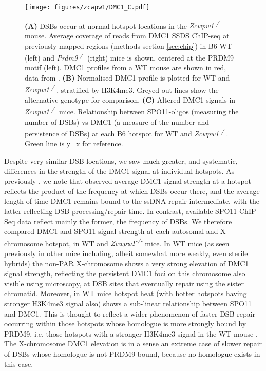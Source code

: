 \begin{figure}[H]
	\centering
	\texttt{[image: figures/zcwpw1/DMC1\_C.pdf]}
	\caption[DMC1 SSDS ChIPseq]{
		\textbf{(A)} DSBs occur at normal hotspot locations in the \textit{Zcwpw1\textsuperscript{-/-}} mouse.
			Average coverage of reads from DMC1 SSDS ChIP-seq at previously mapped regions (methods section \ref{sec:chip}) in B6 WT (left) and \textit{Prdm9\textsuperscript{-/-}} (right) mice is shown, centered at the PRDM9 motif (left).
			DMC1 profiles from a WT mouse are shown in red, data from \parencite{Brick2012Genetic}.
		\textbf{(B)} Normalised DMC1 profile is plotted for WT and \textit{Zcwpw1\textsuperscript{-/-}}, stratified by H3K4me3.
			Greyed out lines show the alternative genotype for comparison.
		\textbf{(C)} Altered DMC1 signals in \textit{Zcwpw1\textsuperscript{-/-}} mice.
			Relationship between SPO11-oligos (measuring the number of DSBs) vs DMC1 (a measure of the number and persistence of DSBs) at each B6 hotspot for WT and \textit{Zcwpw1\textsuperscript{-/-}}.
			Green line is y=x for reference.
	}
	\label{fig:DMC1_SSDS}
\end{figure} 

Despite very similar DSB locations, we saw much greater, and systematic, differences in the strength of the DMC1 signal at individual hotspots.
As previously \parencite{Davies2016Reengineering, Khil2012Sensitive}, we note that observed average DMC1 signal strength at a hotspot reflects the product of the frequency at which DSBs occur there, and the average length of time DMC1 remains bound to the ssDNA repair intermediate, with the latter reflecting DSB processing/repair time.
In contrast, available SPO11 ChIP-Seq data \parencite{Lange2016Landscape} reflect mainly the former, the frequency of DSBs.
We therefore compared DMC1 and SPO11 signal strength at each autosomal and X-chromosome hotspot, in WT and \textit{Zcwpw1\textsuperscript{-/-}} mice.
In WT mice (as seen previously in other mice \parencite{Davies2016Reengineering} including, albeit somewhat more weakly, even sterile hybrids) the non-PAR X-chromosome shows a very strong elevation of DMC1 signal strength, reflecting the persistent DMC1 foci on this chromosome also visible using microscopy, at DSB sites that eventually repair using the sister chromatid.
Moreover, in WT mice hotspot heat (with hotter hotspots having stronger H3K4me3 signal also) shows a sub-linear relationship between SPO11 and DMC1.
This is thought to reflect a wider phenomenon of faster DSB repair occurring within those hotspots whose homologue is more strongly bound by PRDM9, i.e. those hotspots with a stronger H3K4me3 signal in the WT mouse \parencite{Davies2016Reengineering, Hinch2019Factors, Li2019highresolution}.
The X-chromosome DMC1 elevation is in a sense an extreme case of slower repair of DSBs whose homologue is not PRDM9-bound, because no homologue exists in this case.

